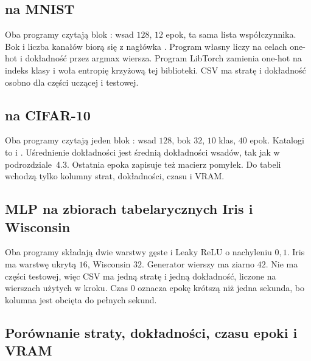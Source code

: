 \subsection{ na MNIST}

Oba programy czytają blok : wsad \(128\), \(12\) epok, ta sama lista współczynnika. Bok i liczba kanałów biorą się z nagłówka . Program własny liczy  na celach one-hot i dokładność przez argmax wiersza. Program LibTorch zamienia one-hot na indeks klasy i woła entropię krzyżową tej biblioteki. CSV ma stratę i dokładność osobno dla części uczącej i testowej.

\subsection{ na CIFAR-10}

Oba programy czytają jeden blok : wsad \(128\), bok \(32\), \(10\) klas, \(40\) epok. Katalogi to  i . Uśrednienie dokładności jest średnią dokładności wsadów, tak jak w podrozdziale~4.3. Ostatnia epoka zapisuje też macierz pomyłek. Do tabeli wchodzą tylko kolumny strat, dokładności, czasu i VRAM.

\subsection{MLP na zbiorach tabelarycznych Iris i Wisconsin}

Oba programy składają dwie warstwy gęste i Leaky ReLU o nachyleniu \(0{,}1\). Iris ma warstwę ukrytą \(16\), Wisconsin \(32\). Generator wierszy ma ziarno \(42\). Nie ma części testowej, więc CSV ma jedną stratę i jedną dokładność, liczone na wierszach użytych w kroku. Czas \(0\) oznacza epokę krótszą niż jedna sekunda, bo kolumna jest obcięta do pełnych sekund.

\subsection{Porównanie straty, dokładności, czasu epoki i VRAM}

